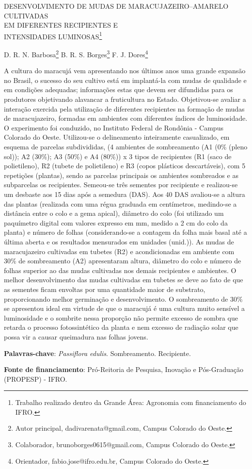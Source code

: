 \documentclass[article,12pt,onesidea,4paper,english,brazil]{abntex2}
\begin{document}
	
	
	\frenchspacing 
	
	\begin{center}
		\LARGE DESENVOLVIMENTO DE MUDAS DE MARACUJAZEIRO–AMARELO CULTIVADAS\\ EM DIFERENTES RECIPIENTES E \\INTENSIDADES LUMINOSAS\footnote{Trabalho realizado dentro da Grande Área: Agronomia com financiamento do IFRO.}
		
		\normalsize
	D. R. N. Barbosa\footnote{Autor principal, dadivarenata@gmail.com, Campus Colorado do Oeste.} 
		B. R. S. Borges\footnote{Colaborador, brunoborges0615@gmail.com, Campus Colorado do Oeste.} 
		F. J. Dores\footnote{Orientador, fabio.jose@ifro.edu.br, Campus Colorado do Oeste.} 
		
	\end{center}
	
	\noindent A cultura do maracujá vem apresentando nos últimos anos uma grande expansão no Brasil, o sucesso do seu cultivo está em implantá-la com mudas de qualidade e em condições adequadas; informações estas que devem ser difundidas para os produtores objetivando alavancar a fruticultura no Estado. Objetivou-se avaliar a interação exercida pela utilização de diferentes recipientes na formação de mudas de maracujazeiro, formadas em ambientes com diferentes índices de luminosidade. O experimento foi conduzido, no Instituto Federal de Rondônia - Campus Colorado do Oeste. Utilizou-se o delineamento inteiramente casualizado, em esquema de parcelas subdivididas, (4 ambientes de sombreamento (A1 (0\% (pleno sol)); A2 (30\%); A3 (50\%) e A4 (80\%)) x 3 tipos de recipientes (R1 (saco de polietileno), R2 (tubete de polietileno) e R3 (copos plásticos descartáveis), com 5 repetições (plantas), sendo as parcelas principais os ambientes sombreados e as subparcelas os recipientes. Semeou-se três sementes por recipiente e realizou-se um desbaste aos 15 dias após a semedura (DAS). Aos 40 DAS avaliou-se a altura das plantas (realizada com uma régua graduada em centímetros, medindo-se a distância entre o colo e a gema apical), diâmetro do colo (foi utilizado um paquímetro digital com valores expresso em mm, medido a 2 cm do colo da planta) e número de folhas (considerando-se a contagem da folha mais basal até a última aberta e os resultados mensurados em unidades (unid.)). As mudas de maracujazeiro cultivadas em tubetes (R2) e acondicionadas em ambiente com 30\% de sombreamento (A2) apresentaram altura, diâmetro do colo e número de folhas superior ao das mudas cultivadas nos demais recipientes e ambientes. O melhor desenvolvimento das mudas cultivadas em tubetes se deve ao fato de que as sementes ficam envoltas por uma quantidade maior de substrato, proporcionando melhor germinação e desenvolvimento. O sombreamento de 30\% se apresentou ideal em virtude de que o maracujá é uma cultura muito sensível a luminosidade e o sombrite nessa proporção não permite excesso de sombra que retarda o processo fotossintético da planta e nem excesso de radiação solar que possa vir a causar queimadura nas folhas jovens.
	
	\vspace{\onelineskip}
	
	\noindent
	\textbf{Palavras-chave}: \textit{Passiflora edulis}. Sombreamento. Recipiente. 
	
	\noindent
	\textbf{Fonte de financiamento}: Pró-Reitoria de Pesquisa, Inovação e Pós-Graduação (PROPESP) - IFRO.
	
\end{document}

